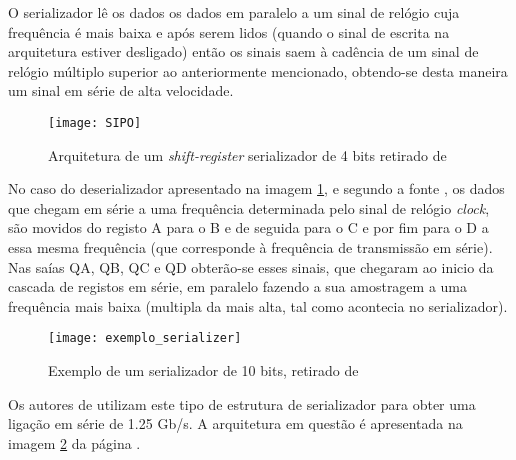 O serializador lê os dados os dados em paralelo a um sinal de relógio cuja frequência é mais baixa e após serem lidos (quando o sinal de escrita na arquitetura estiver desligado) então os sinais saem à cadência de um sinal de relógio múltiplo superior ao anteriormente mencionado, obtendo-se desta maneira um sinal em série de alta velocidade.

	\begin{figure}[h!]
	\begin{center}
		\leavevmode
		\texttt{[image: SIPO]}
		\caption{Arquitetura de um \textit{shift-register} serializador de 4 bits retirado de \cite{R034}}
		\label{fig:sipo}
	\end{center}
\end{figure}


No caso do deserializador apresentado na imagem \ref{fig:sipo}, e segundo a fonte \cite{R034}, os dados que chegam em série a uma frequência determinada pelo sinal de relógio \textit{clock}, são movidos do registo A para o B e de seguida para o C e por fim para o D a essa mesma frequência (que corresponde à frequência de transmissão em série). Nas saías QA, QB, QC e QD obterão-se esses sinais, que chegaram ao inicio da cascada de registos em série, em paralelo fazendo a sua amostragem a uma frequência mais baixa (multipla da mais alta, tal como acontecia no serializador).

\begin{figure}[h!]
	\begin{center}
		\leavevmode
		\texttt{[image: exemplo\_serializer]}
		\caption{Exemplo de um serializador de 10 bits, retirado de \cite{R033}}
		\label{fig:exemplo_de_33}
	\end{center}
\end{figure}

Os autores de \cite{R033} utilizam este tipo de estrutura de serializador para obter uma ligação em série de 1.25 Gb/s. A arquitetura em questão é apresentada na imagem \ref{fig:exemplo_de_33} da página \pageref{fig:exemplo_de_33}.

